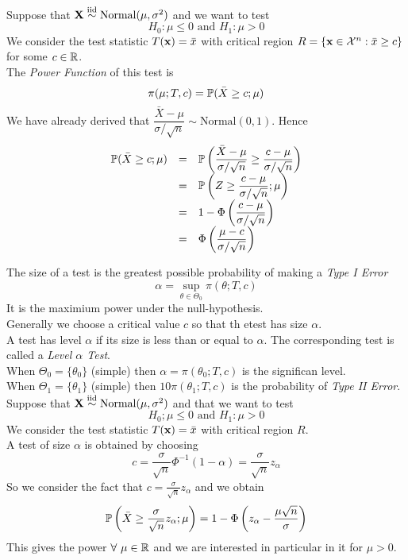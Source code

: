 \documentclass[11pt,a4paper]{article}
\begin{document}
Suppose that $\textbf{X}\overset{\text{iid}}{\sim}\text{Normal}(\mu,\sigma^2)$ and we want to test
$$H_0:\mu\leq0\text{ and }H_1:\mu>0$$
We consider the test statistic $T(\textbf{x})=\bar{x}$ with critical region $R=\{\textbf{x}\in\mathcal{X}^n:\bar{x}\geq c\}$ for some $c\in\mathbb{R}$.\\
The \textit{Power Function} of this test is
$$\pi(\mu;T,c)=\mathbb{P}(\bar{X}\geq c;\mu)$$
We have already derived that $\dfrac{\bar{X}-\mu}{\sigma/\sqrt{n}}\sim\text{Normal}(0,1)$. Hence
\[\begin{array}{rcl}
\mathbb{P}(\bar{X}\geq c;\mu)&=&\mathbb{P}\left(\dfrac{\bar{X}-\mu}{\sigma/\sqrt{n}}\geq\dfrac{c-\mu}{\sigma/\sqrt{n}}\right)\\
&=&\mathbb{P}\left(Z\geq\dfrac{c-\mu}{\sigma/\sqrt{n}};\mu\right)\\
&=&1-\Phi\left(\dfrac{c-\mu}{\sigma/\sqrt{n}}\right)\\
&=&\Phi\left(\dfrac{\mu-c}{\sigma/\sqrt{n}}\right)
\end{array}\]

The size of a test is the greatest possible probability of making a \textit{Type I Error}
$$\alpha=\sup_{\theta\in\Theta_0}\pi(\theta;T,c)$$
\nb It is the maximium power under the null-hypothesis.\\

\remark{}
Generally we choose a critical value $c$ so that th etest has size $\alpha$.\\

A test has level $\alpha$ if its size is less than or equal to $\alpha$. The corresponding test is called a \textit{Level $\alpha$ Test}.\\

When $\Theta_0=\{\theta_0\}$ (\ie simple) then $\alpha=\pi(\theta_0;T,c)$ is the significan level.\\

When $\Theta_1=\{\theta_1\}$ (\ie simple) then $10\pi(\theta_1;T,c)$ is the probability of \textit{Type II Error}.\\

Suppose that $\textbf{X}\overset{\text{iid}}{\sim}\text{Normal}(\mu,\sigma^2)$ and that we want to test
$$H_0;\mu\leq 0\text{ and }H_1:\mu>0$$
We consider the test statistic $T(\textbf{x})=\bar{x}$ with critical region $R$.\\
A test of size $\alpha$ is obtained by choosing
$$c=\frac{\sigma}{\sqrt{n}}\Phi^{-1}(1-\alpha)=\frac{\sigma}{\sqrt{n}}z_\alpha$$
So we consider the fact that $c=\frac{\sigma}{\sqrt{n}}z_\alpha$ and we obtain
$$\mathbb{P}\left(\bar{X}\geq\frac{\sigma}{\sqrt{n}}z_\alpha;\mu\right)=1-\Phi\left(z_\alpha-\frac{\mu\sqrt{n}}{\sigma}\right)$$
This gives the power $\forall\ \mu\in\reals$ and we are interested in particular in it for $\mu>0$.
\end{document}
